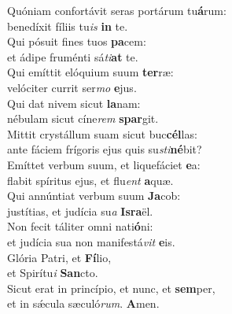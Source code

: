 \evenverse Quóniam confortávit seras portárum tu\textbf{á}rum:~\*\\
\evenverse benedíxit fíliis tu\textit{is} \textbf{in} te.\\
\oddverse Qui pósuit fines tuos \textbf{pa}cem:~\*\\
\oddverse et ádipe fruménti sá\textit{ti}\textbf{at} te.\\
\evenverse Qui emíttit elóquium suum \textbf{ter}ræ:~\*\\
\evenverse velóciter currit ser\textit{mo} \textbf{e}jus.\\
\oddverse Qui dat nivem sicut \textbf{la}nam:~\*\\
\oddverse nébulam sicut cíne\textit{rem} \textbf{spar}git.\\
\evenverse Mittit crystállum suam sicut buc\textbf{cél}las:~\*\\
\evenverse ante fáciem frígoris ejus quis su\textit{sti}\textbf{né}bit?\\
\oddverse Emíttet verbum suum, et liquefáciet \textbf{e}a:~\*\\
\oddverse flabit spíritus ejus, et flu\textit{ent} \textbf{a}quæ.\\
\evenverse Qui annúntiat verbum suum \textbf{Ja}cob:~\*\\
\evenverse justítias, et judícia su\textit{a} \textbf{Is}\textbf{ra}ël.\\
\oddverse Non fecit táliter omni nati\textbf{ó}ni:~\*\\
\oddverse et judícia sua non manifestá\textit{vit} \textbf{e}is.\\
\evenverse Glória Patri, et \textbf{Fí}lio,~\*\\
\evenverse et Spirítu\textit{i} \textbf{San}cto.\\
\oddverse Sicut erat in princípio, et nunc, et \textbf{sem}per,~\*\\
\oddverse et in sǽcula sæculó\textit{rum}. \textbf{A}men.\\
